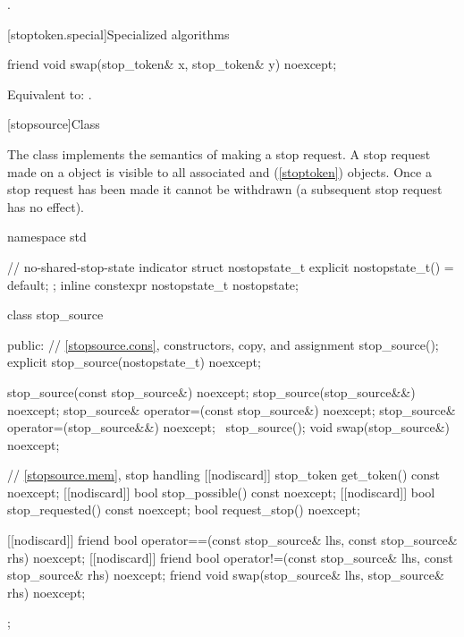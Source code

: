 \begin{itemdescr}
\pnum
\returns
{}.
\end{itemdescr}

[stoptoken.special]{Specialized algorithms}

%
\begin{itemdecl}
friend void swap(stop_token& x, stop_token& y) noexcept;
\end{itemdecl}

\begin{itemdescr}
\pnum
\effects
Equivalent to: .
\end{itemdescr}

%
[stopsource]{Class }

\pnum
{}%
The class  implements the semantics of making a stop request.
A stop request made on a  object is visible to all
associated  and  (\ref{stoptoken}) objects.
Once a stop request has been made it cannot be withdrawn
(a subsequent stop request has no effect).

%
%

\begin{codeblock}
namespace std {
  // no-shared-stop-state indicator
  struct nostopstate_t {
    explicit nostopstate_t() = default;
  };
  inline constexpr nostopstate_t nostopstate{};

  class stop_source {
  public:
    // \ref{stopsource.cons}, constructors, copy, and assignment
    stop_source();
    explicit stop_source(nostopstate_t) noexcept;

    stop_source(const stop_source&) noexcept;
    stop_source(stop_source&&) noexcept;
    stop_source& operator=(const stop_source&) noexcept;
    stop_source& operator=(stop_source&&) noexcept;
    ~stop_source();
    void swap(stop_source&) noexcept;

    // \ref{stopsource.mem}, stop handling
    [[nodiscard]] stop_token get_token() const noexcept;
    [[nodiscard]] bool stop_possible() const noexcept;
    [[nodiscard]] bool stop_requested() const noexcept;
    bool request_stop() noexcept;

    [[nodiscard]] friend bool
    operator==(const stop_source& lhs, const stop_source& rhs) noexcept;
    [[nodiscard]] friend bool
    operator!=(const stop_source& lhs, const stop_source& rhs) noexcept;
    friend void swap(stop_source& lhs, stop_source& rhs) noexcept;
  };
}
\end{codeblock}

